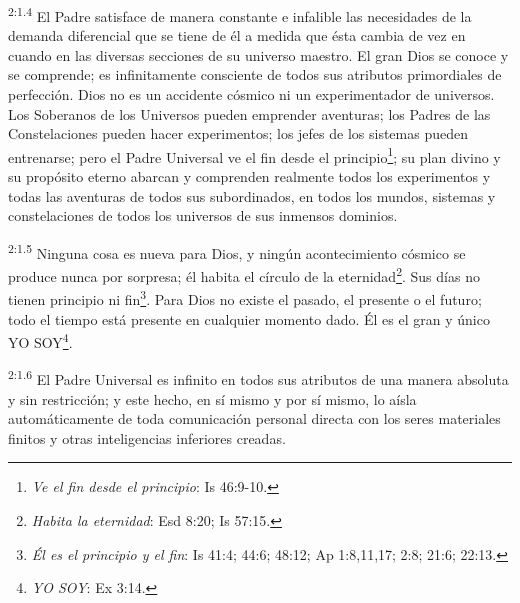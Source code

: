 \par
\textsuperscript{2:1.4} El Padre satisface de manera constante e infalible las necesidades de la demanda diferencial que se tiene de él a medida que ésta cambia de vez en cuando en las diversas secciones de su universo maestro. El gran Dios se conoce y se comprende; es infinitamente consciente de todos sus atributos primordiales de perfección. Dios no es un accidente cósmico ni un experimentador de universos. Los Soberanos de los Universos pueden emprender aventuras; los Padres de las Constelaciones pueden hacer experimentos; los jefes de los sistemas pueden entrenarse; pero el Padre Universal ve el fin desde el principio\footnote{\textit{Ve el fin desde el principio}: Is 46:9-10.}; su plan divino y su propósito eterno abarcan y comprenden realmente todos los experimentos y todas las aventuras de todos sus subordinados, en todos los mundos, sistemas y constelaciones de todos los universos de sus inmensos dominios.

\par
\textsuperscript{2:1.5} Ninguna cosa es nueva para Dios, y ningún acontecimiento cósmico se produce nunca por sorpresa; él habita el círculo de la eternidad\footnote{\textit{Habita la eternidad}: Esd 8:20; Is 57:15.}. Sus días no tienen principio ni fin\footnote{\textit{Él es el principio y el fin}: Is 41:4; 44:6; 48:12; Ap 1:8,11,17; 2:8; 21:6; 22:13.}. Para Dios no existe el pasado, el presente o el futuro; todo el tiempo está presente en cualquier momento dado. Él es el gran y único YO SOY\footnote{\textit{YO SOY}: Ex 3:14.}.

\par
\textsuperscript{2:1.6} El Padre Universal es infinito en todos sus atributos de una manera absoluta y sin restricción; y este hecho, en sí mismo y por sí mismo, lo aísla automáticamente de toda comunicación personal directa con los seres materiales finitos y otras inteligencias inferiores creadas.

